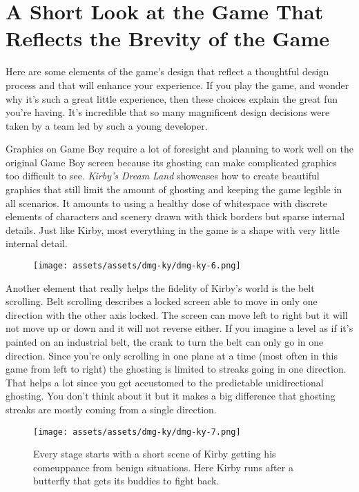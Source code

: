 \documentclass{book}
\begin{document}
\FloatBarrier\needspace{5pt}\section*{A Short Look at the Game That Reflects the Brevity of the Game}\nopagebreak[4]

Here are some elements of the game’s design that reflect a thoughtful design process and that will enhance your experience. If you play the game, and wonder why it’s such a great little experience, then these choices explain the great fun you’re having. It’s incredible that so many magnificent design decisions were taken by a team led by such a young developer.

Graphics on Game Boy require a lot of foresight and planning to work well on the original Game Boy screen because its ghosting can make complicated graphics too difficult to see. \emph{Kirby’s Dream Land} showcases how to create beautiful graphics that still limit the amount of ghosting and keeping the game legible in all scenarios. It amounts to using a healthy dose of whitespace with discrete elements of characters and scenery drawn with thick borders but sparse internal details. Just like Kirby, most everything in the game is a shape with very little internal detail.

\begin{figure}[hbt]
\vskip 10pt
\centering \texttt{[image: assets/assets/dmg-ky/dmg-ky-6.png]}
\vskip 6pt
\end{figure}

Another element that really helps the fidelity of Kirby’s world is the belt scrolling. Belt scrolling describes a locked screen able to move in only one direction with the other axis locked. The screen can move left to right but it will not move up or down and it will not reverse either. If you imagine a level as if it’s painted on an industrial belt, the crank to turn the belt can only go in one direction. Since you’re only scrolling in one plane at a time (most often in this game from left to right) the ghosting is limited to streaks going in one direction. That helps a lot since you get accustomed to the predictable unidirectional ghosting. You don’t think about it but it makes a big difference that ghosting streaks are mostly coming from a single direction.

\begin{figure}[hbt]
\vskip 10pt
\centering \texttt{[image: assets/assets/dmg-ky/dmg-ky-7.png]}\par\pagetwodescription Every stage starts with a short scene of Kirby getting his comeuppance from benign situations. Here Kirby runs after a butterfly that gets its buddies to fight back.
\vskip 6pt
\end{figure}
\end{document}

